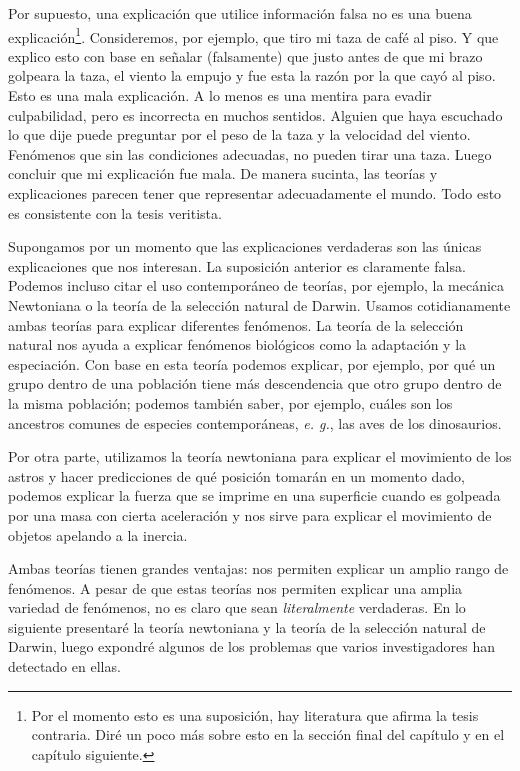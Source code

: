 Por supuesto, una explicación que utilice información falsa no es una buena explicación\footnote{Por el momento esto es una suposición, hay literatura que afirma la tesis contraria. Diré un poco más sobre esto en la sección final del capítulo y en el capítulo siguiente.}. 
Consideremos, por ejemplo, que tiro mi taza de café al piso.
Y que explico esto con base en señalar (falsamente) que justo antes de que mi brazo golpeara la taza, el viento la empujo y fue esta la razón por la que cayó al piso.
Esto es una mala explicación.
A lo menos es una mentira para evadir culpabilidad, pero es incorrecta en muchos sentidos.
Alguien que haya escuchado lo que dije puede preguntar por el peso de la taza y la velocidad del viento.
Fenómenos que sin las condiciones adecuadas, no pueden tirar una taza.
Luego concluir que mi explicación fue mala.
De manera sucinta, las teorías y explicaciones parecen tener que representar adecuadamente el mundo.
Todo esto es consistente con la tesis veritista.

Supongamos por un momento que las explicaciones verdaderas son las únicas explicaciones que nos interesan. 
La suposición anterior es claramente falsa. 
Podemos incluso citar el uso contemporáneo de teorías, por ejemplo, la mecánica Newtoniana o la teoría de la selección natural de Darwin. 
Usamos cotidianamente ambas teorías para explicar diferentes fenómenos. 
La teoría de la selección natural nos ayuda a explicar fenómenos biológicos como la adaptación y la especiación. 
Con base en esta teoría podemos explicar, por ejemplo, por qué un grupo dentro de una población tiene más descendencia que otro grupo dentro de la misma población; podemos también saber, por ejemplo, cuáles son los ancestros comunes de especies contemporáneas, \textit{e. g.}, las aves de los dinosaurios. 

Por otra parte, utilizamos la teoría newtoniana para explicar el movimiento de los astros y hacer predicciones de qué posición tomarán en un momento dado, podemos explicar la fuerza que se imprime en una superficie cuando es golpeada por una masa con cierta aceleración y nos sirve para explicar el movimiento de objetos apelando a la inercia.

Ambas teorías tienen grandes ventajas: nos permiten explicar un amplio rango de fenómenos.
A pesar de que estas teorías nos permiten explicar una amplia variedad de fenómenos, no es claro que sean \emph{literalmente} verdaderas. 
En lo siguiente presentaré la teoría newtoniana y la teoría de la selección natural de Darwin, luego expondré algunos de los problemas que varios investigadores han detectado en ellas.

